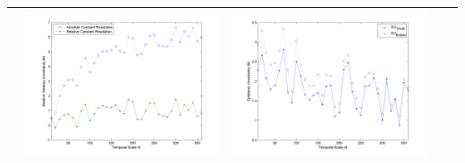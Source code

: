 \documentclass[11pt]{article}
\begin{document}
\begin{table}[H]
{\begin{tabular}{c  c   c   c  c }
&\begin{minipage}{.4\textwidth}\includegraphics[width=\linewidth]{resultgraph/07243500AU.png}\end{minipage}
&\begin{minipage}{.4\textwidth}\includegraphics[width=\linewidth]{resultgraph/07243500EU.png}\end{minipage} 
\\
\bottomrule
\end{tabular}
}
\end{table}
\end{document}
